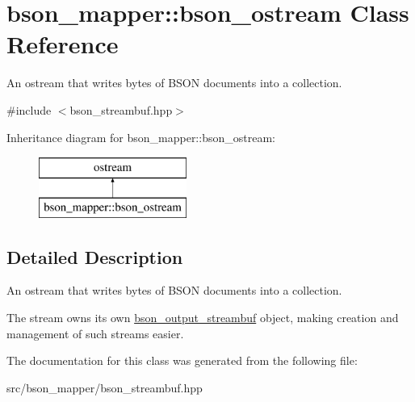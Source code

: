 \hypertarget{classbson__mapper_1_1bson__ostream}{}\section{bson\+\_\+mapper\+:\+:bson\+\_\+ostream Class Reference}
\label{classbson__mapper_1_1bson__ostream}


An ostream that writes bytes of B\+S\+ON documents into a collection.  




{\ttfamily \#include $<$bson\+\_\+streambuf.\+hpp$>$}

Inheritance diagram for bson\+\_\+mapper\+:\+:bson\+\_\+ostream\+:\begin{figure}[H]
\begin{center}
\leavevmode
\includegraphics[height=2.000000cm]{classbson__mapper_1_1bson__ostream}
\end{center}
\end{figure}


\subsection{Detailed Description}
An ostream that writes bytes of B\+S\+ON documents into a collection. 

The stream owns its own \hyperlink{classbson__mapper_1_1bson__output__streambuf}{bson\+\_\+output\+\_\+streambuf} object, making creation and management of such streams easier. 

The documentation for this class was generated from the following file\+:\begin{DoxyCompactItemize}
\item 
src/bson\+\_\+mapper/bson\+\_\+streambuf.\+hpp\end{DoxyCompactItemize}
